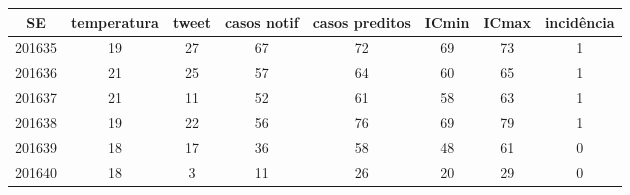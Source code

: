 \begin{tabular}{c|ccccccc}
  \hline
SE & temperatura & tweet & casos notif & casos preditos & ICmin & ICmax & incidência \\ 
  \hline
201635 & 19 & 27 & 67 & 72 & 69 & 73 & 1 \\ 
  201636 & 21 & 25 & 57 & 64 & 60 & 65 & 1 \\ 
  201637 & 21 & 11 & 52 & 61 & 58 & 63 & 1 \\ 
  201638 & 19 & 22 & 56 & 76 & 69 & 79 & 1 \\ 
  201639 & 18 & 17 & 36 & 58 & 48 & 61 & 0 \\ 
  201640 & 18 & 3 & 11 & 26 & 20 & 29 & 0 \\ 
   \hline
\end{tabular}
